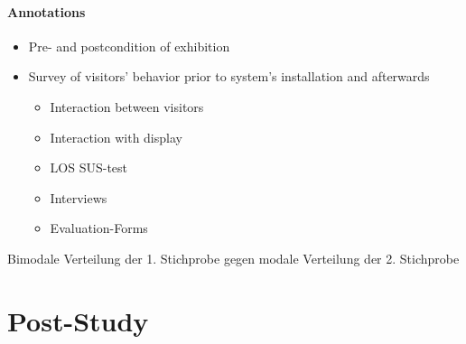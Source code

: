 \paragraph{Annotations}

\begin{itemize}
	\item Pre- and postcondition of exhibition
	\item Survey of visitors' behavior prior to system's installation and afterwards
	\begin{itemize}
		\item Interaction between visitors
		\item Interaction with display
		\item \ac{LOS} SUS-test
		\item Interviews
		\item Evaluation-Forms
	\end{itemize}
\end{itemize}

Bimodale Verteilung der 1. Stichprobe gegen modale Verteilung der 2. Stichprobe


\section{Post-Study}
\label{evaluation_post}
